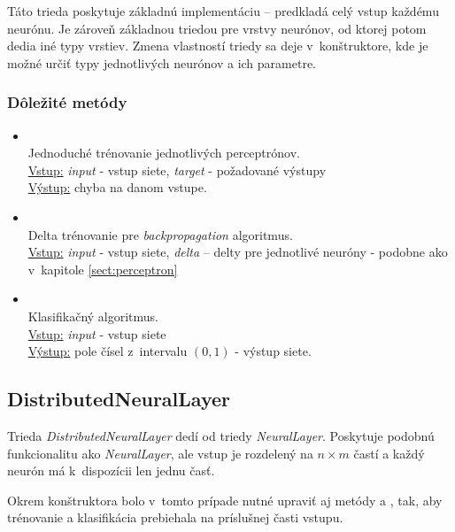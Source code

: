 Táto trieda poskytuje základnú implementáciu -- predkladá celý vstup každému neurónu. Je zároveň základnou triedou pre vrstvy neurónov, od ktorej potom dedia iné typy vrstiev. Zmena vlastností triedy sa deje v~konštruktore, kde je možné určiť typy jednotlivých neurónov a ich parametre.

\subsubsection{Dôležité metódy}
\begin{itemize}
\item {}
\\Jednoduché trénovanie jednotlivých perceptrónov.
\\ \underline{Vstup:} \textit{input} - vstup siete, \textit{target} - požadované výstupy 
\\ \underline{Výstup:} chyba na danom vstupe.
\item {}
\\Delta trénovanie pre \textit{backpropagation} algoritmus.
\\ \underline{Vstup:} \textit{input} - vstup siete, \textit{delta} -- delty pre jednotlivé neuróny - podobne ako v~kapitole \ref{sect:perceptron}
\item {}
\\ Klasifikačný algoritmus.
\\ \underline{Vstup:} \textit{input} - vstup siete
\\ \underline{Výstup:} pole čísel z~intervalu $(0,1)$ - výstup siete.
\end{itemize}

\subsection{DistributedNeuralLayer}
Trieda \textit{DistributedNeuralLayer} dedí od triedy \textit{NeuralLayer}. Poskytuje podobnú funkcionalitu ako \textit{NeuralLayer}, ale vstup je rozdelený na $n\times m$ častí a každý neurón má k~dispozícii len jednu časť. 

Okrem konštruktora bolo v~tomto prípade nutné upraviť aj metódy  a , tak, aby trénovanie a klasifikácia prebiehala na príslušnej časti vstupu.

